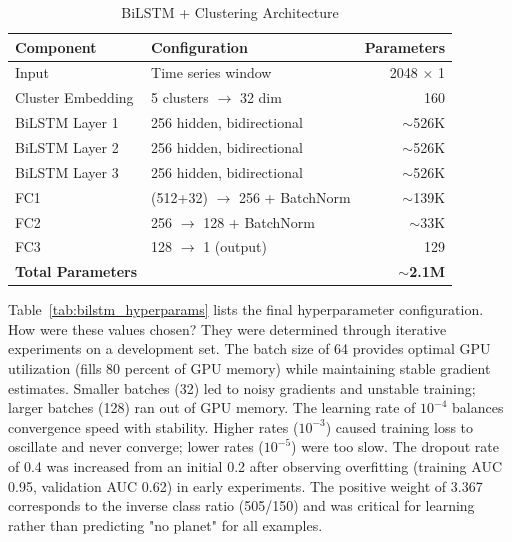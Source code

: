 \documentclass[letterpaper]{article} %
\begin{document}
\begin{table}[h]
\centering
\caption{BiLSTM + Clustering Architecture}
\label{tab:bilstm_architecture}
\begin{tabular}{@{}llr@{}}
\toprule
\textbf{Component} & \textbf{Configuration} & \textbf{Parameters} \\
\midrule
Input & Time series window & 2048 $\times$ 1 \\
Cluster Embedding & 5 clusters $\rightarrow$ 32 dim & 160 \\
BiLSTM Layer 1 & 256 hidden, bidirectional & $\sim$526K \\
BiLSTM Layer 2 & 256 hidden, bidirectional & $\sim$526K \\
BiLSTM Layer 3 & 256 hidden, bidirectional & $\sim$526K \\
FC1 & (512+32) $\rightarrow$ 256 + BatchNorm & $\sim$139K \\
FC2 & 256 $\rightarrow$ 128 + BatchNorm & $\sim$33K \\
FC3 & 128 $\rightarrow$ 1 (output) & 129 \\
\midrule
\textbf{Total Parameters} & & \textbf{$\sim$2.1M} \\
\bottomrule
\end{tabular}
\end{table}

Table~\ref{tab:bilstm_hyperparams} lists the final hyperparameter configuration. How were these values chosen? They were determined through iterative experiments on a development set. The batch size of 64 provides optimal GPU utilization (fills 80 percent of GPU memory) while maintaining stable gradient estimates. Smaller batches (32) led to noisy gradients and unstable training; larger batches (128) ran out of GPU memory. The learning rate of $10^{-4}$ balances convergence speed with stability. Higher rates ($10^{-3}$) caused training loss to oscillate and never converge; lower rates ($10^{-5}$) were too slow. The dropout rate of 0.4 was increased from an initial 0.2 after observing overfitting (training AUC 0.95, validation AUC 0.62) in early experiments. The positive weight of 3.367 corresponds to the inverse class ratio (505/150) and was critical for learning rather than predicting "no planet" for all examples.
\end{document}
